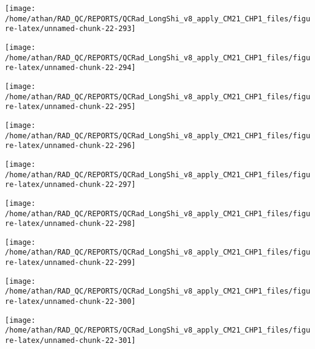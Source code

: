 \documentclass[
  10pt,
  a4paper,oneside]{article}
\begin{document}
\begin{center}\texttt{[image: /home/athan/RAD\_QC/REPORTS/QCRad\_LongShi\_v8\_apply\_CM21\_CHP1\_files/figure-latex/unnamed-chunk-22-293]} \end{center}

\begin{center}\texttt{[image: /home/athan/RAD\_QC/REPORTS/QCRad\_LongShi\_v8\_apply\_CM21\_CHP1\_files/figure-latex/unnamed-chunk-22-294]} \end{center}

\begin{center}\texttt{[image: /home/athan/RAD\_QC/REPORTS/QCRad\_LongShi\_v8\_apply\_CM21\_CHP1\_files/figure-latex/unnamed-chunk-22-295]} \end{center}

\begin{center}\texttt{[image: /home/athan/RAD\_QC/REPORTS/QCRad\_LongShi\_v8\_apply\_CM21\_CHP1\_files/figure-latex/unnamed-chunk-22-296]} \end{center}

\begin{center}\texttt{[image: /home/athan/RAD\_QC/REPORTS/QCRad\_LongShi\_v8\_apply\_CM21\_CHP1\_files/figure-latex/unnamed-chunk-22-297]} \end{center}

\begin{center}\texttt{[image: /home/athan/RAD\_QC/REPORTS/QCRad\_LongShi\_v8\_apply\_CM21\_CHP1\_files/figure-latex/unnamed-chunk-22-298]} \end{center}

\begin{center}\texttt{[image: /home/athan/RAD\_QC/REPORTS/QCRad\_LongShi\_v8\_apply\_CM21\_CHP1\_files/figure-latex/unnamed-chunk-22-299]} \end{center}

\begin{center}\texttt{[image: /home/athan/RAD\_QC/REPORTS/QCRad\_LongShi\_v8\_apply\_CM21\_CHP1\_files/figure-latex/unnamed-chunk-22-300]} \end{center}

\begin{center}\texttt{[image: /home/athan/RAD\_QC/REPORTS/QCRad\_LongShi\_v8\_apply\_CM21\_CHP1\_files/figure-latex/unnamed-chunk-22-301]} \end{center}
\end{document}
